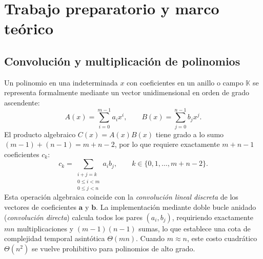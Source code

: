\section{Trabajo preparatorio y marco teórico}

\subsection{Convolución y multiplicación de polinomios}
Un polinomio en una indeterminada $x$ con coeficientes en un anillo o campo $\mathbb{K}$ se representa formalmente mediante un vector unidimensional en orden de grado ascendente:
\begin{equation}
A(x) = \sum_{i=0}^{m-1} a_i x^i, \qquad B(x) = \sum_{j=0}^{n-1} b_j x^j.
\end{equation}
El producto algebraico $C(x) = A(x)B(x)$ tiene grado a lo sumo $(m-1) + (n-1) = m+n-2$, por lo que requiere exactamente $m+n-1$ coeficientes $c_k$:
\begin{equation}
c_k = \sum_{\substack{i+j=k \\ 0 \le i < m \\ 0 \le j < n}} a_i b_j, \qquad k \in \{0, 1, \dots, m+n-2\}.
\end{equation}
Esta operación algebraica coincide con la \emph{convolución lineal discreta} de los vectores de coeficientes $\mathbf{a}$ y $\mathbf{b}$. La implementación mediante doble bucle anidado (\emph{convolución directa}) calcula todos los pares $(a_i, b_j)$, requiriendo exactamente $mn$ multiplicaciones y $(m-1)(n-1)$ sumas, lo que establece una cota de complejidad temporal asintótica $\Theta(mn)$. Cuando $m \approx n$, este costo cuadrático $\Theta(n^2)$ se vuelve prohibitivo para polinomios de alto grado.

